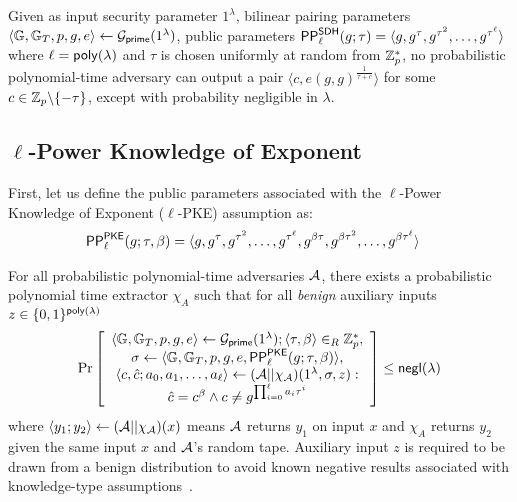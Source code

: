 \begin{definition}
\label{def:q-sbdh}
Given as input security parameter $1^\lambda$, bilinear pairing parameters $\langle \mathbb{G}, \mathbb{G}_T, p, g, e\rangle \leftarrow \mathcal{G}_{\mathsf{prime}}(1^\lambda)$,
public parameters  $\mathsf{PP}^\mathsf{SDH}_\ell(g;\tau)=\langle g, g^\tau, g^{\tau^2},\allowbreak \dots, g^{\tau^\ell}\rangle$ where $\ell = \mathsf{poly}(\lambda)$ and $\tau$ is chosen uniformly at random from $\mathbb{Z}_p^*$, no probabilistic polynomial-time adversary can output a pair $\langle c, e(g,g)^\frac{1}{\tau+c}\rangle$ for some $c \in \mathbb{Z}_p \backslash \{-\tau\}$, except with probability negligible in $\lambda$.
\end{definition}

\subsection{$\ell$-Power Knowledge of Exponent}
\label{s:prelim:pke}

First, let us define the public parameters associated with the $\ell$-Power Knowledge of Exponent ($\ell$-PKE) assumption as:
\begin{align*}
\mathsf{PP}^\mathsf{PKE}_\ell(g; \tau,\beta)  &= \langle g,g^\tau, g^{\tau^2},\dots,g^{\tau^\ell},g^{\beta\tau}, g^{\beta\tau^2},\dots,g^{\beta\tau^\ell}\rangle
\end{align*}

\begin{definition}
\label{def:q-pke}
For all probabilistic polynomial-time adversaries $\mathcal{A}$, there exists a probabilistic polynomial time extractor $\chi_A$ such that for all \emph{benign} auxiliary inputs $z \in \{0,1\}^{\mathsf{poly}(\lambda)}$ 
\begin{align*}
\Pr \left[ \begin{array}{c}
    \langle \mathbb{G}, \mathbb{G}_T, p, g, e\rangle \leftarrow \mathcal{G}_{\mathsf{prime}}(1^\lambda); \langle \tau, \beta \rangle \in_R \mathbb{Z}_p^*,\\
    \sigma \leftarrow \langle \mathbb{G}, \mathbb{G}_T, p, g, e, \mathsf{PP}^\mathsf{PKE}_\ell(g; \tau, \beta)\rangle,\\
    \langle c, \hat{c}; a_0, a_1, \dots, a_\ell\rangle \leftarrow (\mathcal{A}||\chi_\mathcal{A})(1^\lambda,\sigma,z):\\
    \hat{c} = c^\beta \wedge c \ne g^{\prod_{i=0}^\ell {a_i \tau^i}}
\end{array} \right] \le \mathsf{negl}(\lambda)
\end{align*}
where $\langle y_1; y_2\rangle \leftarrow (\mathcal{A}||\chi_\mathcal{A})(x)$ means $\mathcal{A}$ returns $y_1$ on input $x$ and $\chi_A$ returns $y_2$ given the same input $x$ and $\mathcal{A}$'s random tape.
Auxiliary input $z$ is required to be drawn from a benign distribution to avoid known negative results associated with knowledge-type assumptions~\cite{BP15,BCPR14}.
\end{definition}

